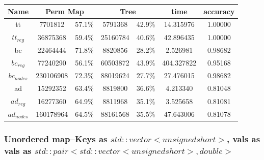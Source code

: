 \documentclass[]{article}
\theoremstyle{definition}
\begin{document}
\begin{center}
\begin{tabular} { |c|c|c|c|c|c|c| }
\hline
Name & \multicolumn{2}{c|}{Perm Map} & \multicolumn{2}{c|}{Tree} & time & accuracy \\
\hline

tt & 7701812 & 57.1\%  & 5791368 & 42.9\% & 14.315976 & 1.00000 \\

$tt_{reg}$ & 36875368 & 59.4\% & 25160784 & 40.6\% & 42.896435 & 1.00000 \\

bc & 22464444 & 71.8\% & 8820856 & 28.2\% & 2.526981 & 0.98682 \\

$bc_{reg}$ & 77240290 & 56.1\% & 60503872 & 43.9\% & 404.327822 & 0.95168 \\

$bc_{nodes}$ & 230106908 & 72.3\% & 88019624 & 27.7\% & 27.476015 & 0.98682 \\

ad & 15292352 & 63.4\% & 8819800 & 36.6\% & 4.213340 & 0.81048 \\

$ad_{reg}$ & 16277360 & 64.9\% & 8811968 & 35.1\% & 3.525658 & 0.81081 \\

$ad_{nodes}$ & 160178964 & 64.5\% & 88161568 & 35.5\% & 47.643006 & 0.81078 \\
\hline
\end{tabular}
\end{center}

\subsubsection{Unordered map--Keys as $std::vector<unsigned short>$, vals as vals as $std::pair<std::vector<unsigned short>, double>$}
\end{document}
